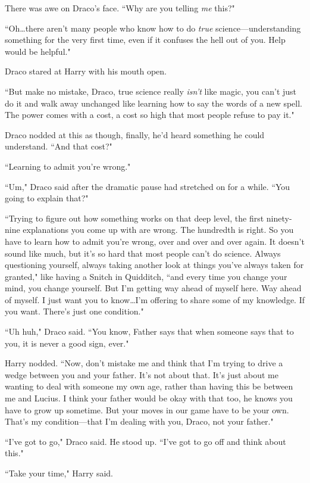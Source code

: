 There was awe on Draco's face. ``Why are you telling \emph{me} this?"

``Oh…there aren't many people who know how to do \emph{true} science—understanding something for the very first time, even if it confuses the hell out of you. Help would be helpful."

Draco stared at Harry with his mouth open.

``But make no mistake, Draco, true science really \emph{isn't} like magic, you can't just do it and walk away unchanged like learning how to say the words of a new spell. The power comes with a cost, a cost so high that most people refuse to pay it."

Draco nodded at this as though, finally, he'd heard something he could understand. ``And that cost?"

``Learning to admit you're wrong."

``Um," Draco said after the dramatic pause had stretched on for a while. ``You going to explain that?"

``Trying to figure out how something works on that deep level, the first ninety-nine explanations you come up with are wrong. The hundredth is right. So you have to learn how to admit you're wrong, over and over and over again. It doesn't sound like much, but it's so hard that most people can't do science. Always questioning yourself, always taking another look at things you've always taken for granted," like having a Snitch in Quidditch, ``and every time you change your mind, you change yourself. But I'm getting way ahead of myself here. Way ahead of myself. I just want you to know…I'm offering to share some of my knowledge. If you want. There's just one condition."

``Uh huh," Draco said. ``You know, Father says that when someone says that to you, it is never a good sign, ever."

Harry nodded. ``Now, don't mistake me and think that I'm trying to drive a wedge between you and your father. It's not about that. It's just about me wanting to deal with someone my own age, rather than having this be between me and Lucius. I think your father would be okay with that too, he knows you have to grow up sometime. But your moves in our game have to be your own. That's my condition—that I'm dealing with you, Draco, not your father."

``I've got to go," Draco said. He stood up. ``I've got to go off and think about this."

``Take your time," Harry said.

